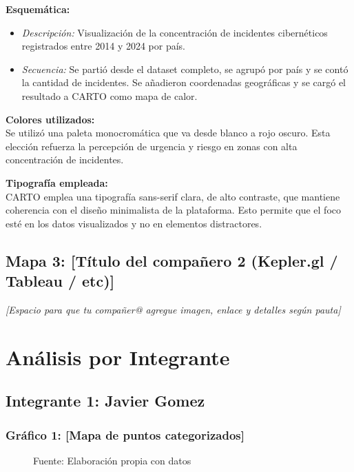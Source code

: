 \documentclass[12pt, a4paper]{article}
\begin{document}
\textbf{Esquemática:} \\
\begin{itemize}
    \item \textit{Descripción:} Visualización de la concentración de incidentes cibernéticos registrados entre 2014 y 2024 por país.
    \item \textit{Secuencia:} Se partió desde el dataset completo, se agrupó por país y se contó la cantidad de incidentes. Se añadieron coordenadas geográficas y se cargó el resultado a CARTO como mapa de calor.
\end{itemize}

\textbf{Colores utilizados:} \\
Se utilizó una paleta monocromática que va desde blanco a rojo oscuro. Esta elección refuerza la percepción de urgencia y riesgo en zonas con alta concentración de incidentes.

\textbf{Tipografía empleada:} \\
CARTO emplea una tipografía sans-serif clara, de alto contraste, que mantiene coherencia con el diseño minimalista de la plataforma. Esto permite que el foco esté en los datos visualizados y no en elementos distractores.



\vspace{1em}
\subsection*{Mapa 3: [Título del compañero 2 (Kepler.gl / Tableau / etc)]}
\textit{[Espacio para que tu compañer@ agregue imagen, enlace y detalles según pauta]}


\section*{Análisis por Integrante}

\subsection*{Integrante 1: Javier Gomez}


\subsubsection*{Gráfico 1: [Mapa de puntos categorizados]}
\begin{figure}[H]
    \centering
    \caption{Fuente: Elaboración propia con datos}
\end{figure}
\end{document}
